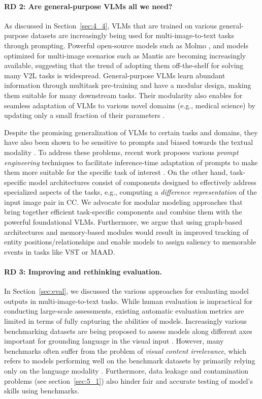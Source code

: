 \paragraph{RD 2: Are general-purpose VLMs all we need?}
As discussed in Section~\ref{sec:4_4}, VLMs that are trained on various general-purpose datasets are increasingly being used for multi-image-to-text tasks through prompting. Powerful open-source models such as Molmo \cite{molmo}, and models optimized for multi-image scenarios such as Mantis \cite{mantis} are becoming increasingly available, suggesting that the trend of adopting them off-the-shelf for solving many V2L tasks is widespread. General-purpose VLMs learn abundant information through multitask pre-training and have a modular design, making them suitable for many downstream tasks. Their modularity also enables for seamless adaptation of VLMs to various novel domains (e.g., medical science) by updating only a small fraction of their parameters \cite{rd_model1}.

Despite the promising generalization of VLMs to certain tasks and domains, they have also been shown to be sensitive to prompts \cite{rd_model2_a,rd_model2_b} and biased towards the textual modality \cite{rd_model3}. To address these problems, recent work proposes various \textit{prompt engineering} techniques to facilitate inference-time adaptation of prompts to make them more suitable for the specific task of interest \cite{rd_model4,rd_model5}. On the other hand, task-specific model architectures consist of components designed to effectively address specialized aspects of the tasks, e.g., computing a \textit{difference representation} of the input image pair in \color{xkcdVividBlue}CC\color{black}. We advocate for modular modeling approaches that bring together efficient task-specific components and combine them with the powerful foundational VLMs. Furthermore, we argue that using graph-based architectures and memory-based modules would result in improved tracking of entity positions/relationships and enable models to assign saliency to memorable events in tasks like \color{xkcdVividBlue}VST \color{black} or \color{xkcdVividBlue}MAAD\color{black}.

\paragraph{RD 3: Improving and rethinking evaluation.}
In Section~\ref{sec:eval}, we discussed the various approaches for evaluating model outputs in multi-image-to-text tasks. While human evaluation is impractical for conducting large-scale assessments, existing automatic evaluation metrics are limited in terms of fully capturing the abilities of models. Increasingly various benchmarking datasets are being proposed to assess models along different axes important for grounding language in the visual input \cite{rd_eval2}. However, many benchmarks often suffer from the problem of \textit{visual content irrelevance}, which refers to models performing well on the benchmark datasets by primarily relying only on the language modality \cite{rd_eval1}. Furthermore, data leakage and contamination problems (see section~\ref{sec:5_1}) also hinder fair and accurate testing of model's skills using benchmarks.

